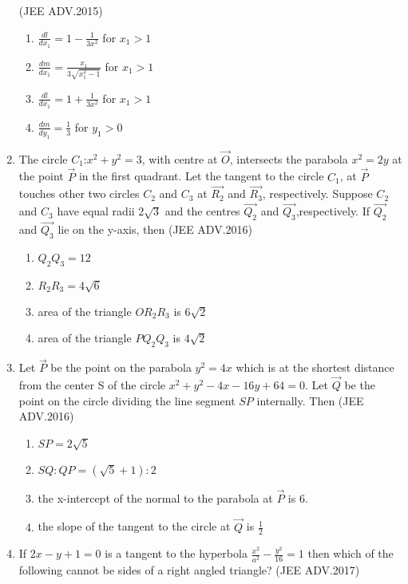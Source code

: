 \documentclass[journal,12pt,onecolumn]{IEEEtran}
\theoremstyle{remark}
\begin{document}
\begin{enumerate}
	      \hfill(JEE ADV.2015)
	      
	      \begin{enumerate}
		      \item $\frac{dl}{dx_1}=1-\frac{1}{3x^2}$ for $x_1>1$ 
		      \item $\frac{dm}{dx_1}=\frac{x_1}{3\sqrt{x_1^2-1}}$ for $x_1>1$ 
		      \item $\frac{dl}{dx_1}=1+\frac{1}{3x^2}$ for $x_1>1$
		      \item $\frac{dm}{dy_1}=\frac{1}{3}$ for $y_1>0$ 
	      \end{enumerate}
      \item The circle $C_1$:$x^2+y^2=3$, with centre at $\vec{O}$, intersects the parabola $x^2=2y$ at the point $\vec{P}$ in the first quadrant. Let the tangent to the circle $C_1$, at $\vec{P}$ touches other two circles $C_2$ and $C_3$ at $\vec{R_2}$ and $\vec{R_3}$, respectively. Suppose $C_2$ and $C_3$ have equal radii $2\sqrt{3}$ and the centres $\vec{Q_2}$ and $\vec{Q_3}$,respectively. If $\vec{Q_2}$ and $\vec{Q_3}$ lie on the y-axis, then 
	      \hfill(JEE ADV.2016)
	      
	      \begin{enumerate}
		      \item $Q_2Q_3=12$
		      \item $R_2R_3=4\sqrt{6}$
		      \item area of the triangle $OR_2R_3$ is $6\sqrt{2}$
		      \item area of the triangle $PQ_2Q_3$ is $4\sqrt{2}$
	      \end{enumerate}
      \item Let $\vec{P}$ be the point on the parabola $y^2=4x$ which is at the shortest distance from the center S of the circle $x^2+y^2-4x-16y+64=0$. Let $\vec{Q}$ be the point on the circle
	      dividing the line segment $SP$ internally. Then 
	      \hfill(JEE ADV.2016)
	      
	      \begin{enumerate}
		      \item $SP=2\sqrt{5}$
		      \item $SQ:QP=(\sqrt{5}+1):2$
		      \item the x-intercept of the normal to the parabola at $\vec{P}$ is $6$.
		      \item the slope of the tangent to the circle at $\vec{Q}$ is $\frac{1}{2}$
		      
	      \end{enumerate}
      \item If $2x-y+1=0$ is a tangent to the hyperbola $\frac{x^2}{a^2}-\frac{y^2}{16}=1$ then which of the following cannot be sides of a right angled triangle? 
	      \hfill(JEE ADV.2017)
	      

\end{enumerate}
\end{document}
